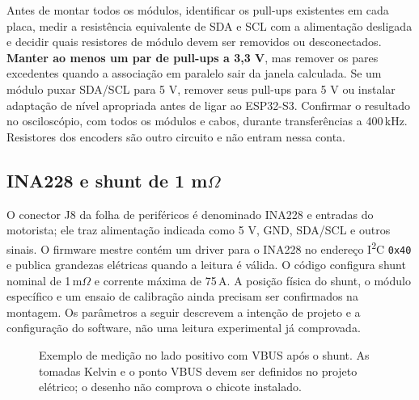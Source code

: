 Antes de montar todos os módulos, identificar os pull-ups existentes em cada placa, medir a resistência equivalente de SDA e SCL com a alimentação desligada e decidir quais resistores de módulo devem ser removidos ou desconectados. \textbf{Manter ao menos um par de pull-ups a 3,3 V}, mas remover os pares excedentes quando a associação em paralelo sair da janela calculada. Se um módulo puxar SDA/SCL para 5 V, remover seus pull-ups para 5 V ou instalar adaptação de nível apropriada antes de ligar ao ESP32-S3. Confirmar o resultado no osciloscópio, com todos os módulos e cabos, durante transferências a 400\,kHz. Resistores dos encoders são outro circuito e não entram nessa conta.

\subsection{INA228 e shunt de 1 \texorpdfstring{m$\Omega$}{mΩ}}
O conector J8 da folha de periféricos é denominado INA228 e entradas do motorista; ele traz alimentação indicada como 5 V, GND, SDA/SCL e outros sinais. O firmware mestre contém um driver para o INA228 no endereço I\textsuperscript{2}C \texttt{0x40} e publica grandezas elétricas quando a leitura é válida. O código configura shunt nominal de 1\,m$\Omega$ e corrente máxima de 75\,A. A posição física do shunt, o módulo específico e um ensaio de calibração ainda precisam ser confirmados na montagem. Os parâmetros a seguir descrevem a intenção de projeto e a configuração do software, não uma leitura experimental já comprovada.

\begin{figure}[htbp]\centering
{}
\caption{Exemplo de medição no lado positivo com VBUS após o shunt. As tomadas Kelvin e o ponto VBUS devem ser definidos no projeto elétrico; o desenho não comprova o chicote instalado.}\label{fig:shunt-kelvin}
\end{figure}

